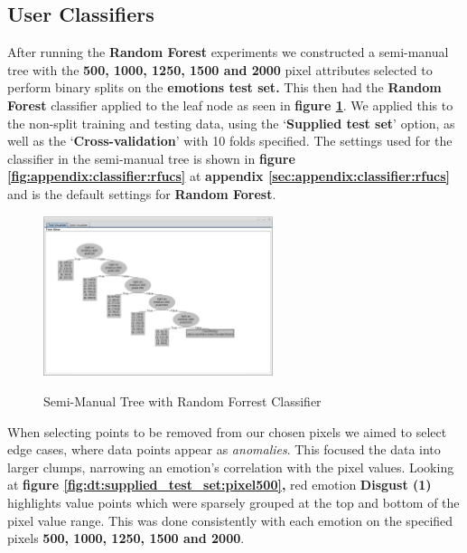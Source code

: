 \subsection{User Classifiers}
\label{sec:dt:uc}
After running the \textbf{Random Forest} experiments we constructed a semi-manual tree with the \textbf{500, 1000, 1250, 1500 and 2000} pixel attributes selected to perform binary splits on the \textbf{emotions test set.} This then had the \textbf{Random Forest} classifier applied to the leaf node as seen in \textbf{figure \ref{fig:dt:semi_manual_random_forrest}}. We applied this to the non-split training and testing data, using the `\textbf{Supplied test set}' option, as well as the `\textbf{Cross-validation}' with 10 folds specified. The settings used for the classifier in the semi-manual tree is shown in \textbf{figure \ref{fig:appendix:classifier:rfucs}} at \textbf{appendix \ref{sec:appendix:classifier:rfucs}} and is the default settings for \textbf{Random Forest}.

\begin{figure}[hbt!]
	\centering
      \includegraphics[width=0.6\textwidth]{imgs/userClassifier/noSplit/all/Train-and-Test/tree_settings_with_classifier.png} \\
	\caption{Semi-Manual Tree with Random Forrest Classifier}
	\label{fig:dt:semi_manual_random_forrest}
\end{figure}


When selecting points to be removed from our chosen pixels we aimed to select edge cases, where data points appear as \textit{anomalies}. This focused the data into larger clumps, narrowing an emotion's correlation with the pixel values. Looking at \textbf{figure \ref{fig:dt:supplied_test_set:pixel500},}  red emotion \textbf{Disgust (1)} highlights value points which were sparsely grouped at the top and bottom of the pixel value range. This was done consistently with each emotion on the specified pixels \textbf{500, 1000, 1250, 1500 and 2000}. 

